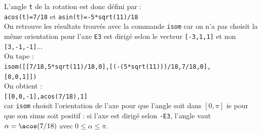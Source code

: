 \documentclass[a4paper,11pt]{book}
\begin{document}
L'angle {\tt t} de la rotation est donc d\'efini par :\\
{\tt acos(t)=7/18} et {\tt asin(t)=-5*sqrt(11)/18}\\
On retrouve les r\'esultats trouv\'es avec la commande {\tt isom} car 
on n'a pas choisit la m\^eme orientation pour l'axe {\tt E3} est dirig\'e selon
 le vecteur {\tt [-3,1,1]} et non {\tt [3,-1,-1]}... \\
On tape :\\
{\tt isom([[7/18,5*sqrt(11)/18,0],[(-(5*sqrt(11)))/18,7/18,0],}\\
{\tt [0,0,1]])}\\
On obtient :\\
{\tt [[0,0,-1],acos(7/18),1]}\\
car {\tt isom} choisit l'orientation
de l'axe pour que l'angle soit dans $[0,\pi]$ ie pour que son sinus soit 
positif : si l'axe est dirig\'e selon {\tt -E3}, l'angle vaut 
$\alpha=\acos(7/18)$ avec $0\leq \alpha \leq \pi$.
\end{document}
